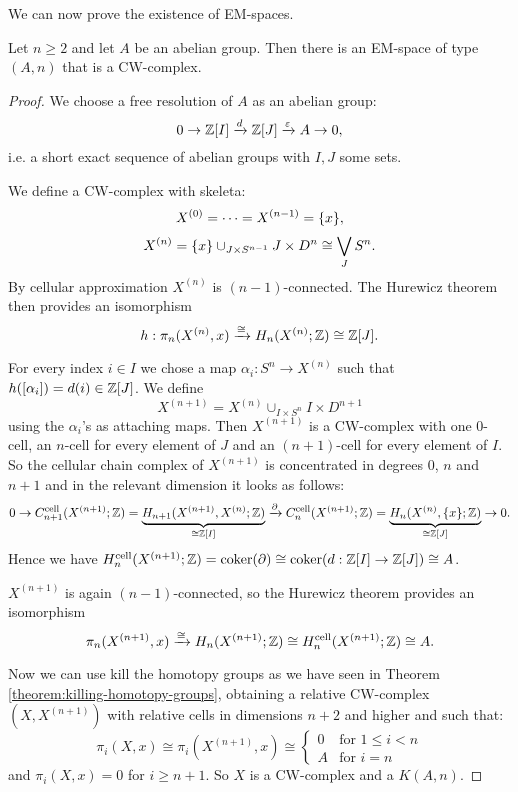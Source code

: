 

We can now prove the existence of EM-spaces.

\begin{theorem}
Let $n\geq2$ and let $A$ be an abelian group. Then there is an EM-space of type $(A,n)$ that is a CW-complex.
\end{theorem}

\begin{proof}
We choose a free resolution of $A$ as an abelian group:
\[0\to{\mathbb Z}[I]\xrightarrow{d}{\mathbb Z}[J]\xrightarrow{\varepsilon}A\to0,\]
i.e. a short exact sequence of abelian groups with $I,J$ some sets.

We define a CW-complex with skeleta:
\[X^{(0)}=\cdots=X^{({n-1})}=\{x\},\]
\[X^{(n)}=\{x\}\cup_{J\times S^{n-1}}J\times D^n\cong\bigvee_J S^n.\]
By cellular approximation $X^{(n)}$ is $(n-1)$-connected. The Hurewicz theorem then provides an isomorphism
\[h:\pi_n(X^{(n)},x)\xrightarrow{\cong}H_n(X^{(n)};{\mathbb Z})\cong{\mathbb Z}[J].\]

For every index $i\in I$ we chose a map $\alpha_i:S^n\to X^{(n)}$ such that $h([\alpha_i])=d(i)\in{\mathbb Z}[J]$. We define
\[X^{(n+1)}=X^{(n)}\cup_{I\times S^n}I\times D^{n+1}\]
using the $\alpha_i$'s as attaching maps. Then $X^{(n+1)}$ is a CW-complex with one $0$-cell, an $n$-cell for every element of $J$ and an $(n+1)$-cell for every element of $I$. So the cellular chain complex of $X^{(n+1)}$ is concentrated in degrees $0$, $n$ and $n+1$ and in the relevant dimension it looks as follows:
{\small
\[0\to C^\text{cell}_{n+1}(X^{(n+1)};{\mathbb Z})=\underbrace{H_{n+1}(X^{(n+1)},X^{(n)};{\mathbb Z})}_{\cong{\mathbb Z}[I]}\xrightarrow{\partial}C^\text{cell}_n(X^{(n+1)};{\mathbb Z})=\underbrace{H_n(X^{(n)},\{x\};{\mathbb Z})}_{\cong{\mathbb Z}[J]}\to0.\]}Hence we have $H_n^\text{cell}(X^{(n+1)};{\mathbb Z})=\operatorname{coker}(\partial)\cong\operatorname{coker}(d:{\mathbb Z}[I]\to{\mathbb Z}[J])\cong A$.

$X^{(n+1)}$ is again $(n-1)$-connected, so the Hurewicz theorem provides an isomorphism
\[\pi_n(X^{(n+1)},x)\xrightarrow{\cong}H_n(X^{(n+1)};{\mathbb Z})\cong H^\text{cell}_n(X^{(n+1)};{\mathbb Z})\cong A.\]

Now we can use kill the homotopy groups as we have seen in Theorem \ref{theorem:killing-homotopy-groups}, obtaining a relative CW-complex $(X,X^{(n+1)})$ with relative cells in dimensions $n+2$ and higher and such that:
\[\pi_i(X,x)\cong\pi_i(X^{(n+1)},x)\cong\begin{cases}
0 & \text{for } 1\le i < n\\
A & \text{for } i = n
\end{cases}\]
and $\pi_i(X,x)=0$ for $i\ge n+1$. So $X$ is a CW-complex and a $K(A,n)$.
\end{proof}

